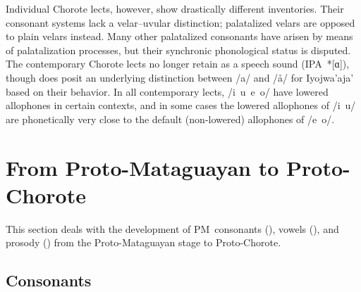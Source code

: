 \begin{table}
\caption{Proto-Chorote consonants}
\label{pch-inv-cons}
\end{table}

Individual Chorote lects, however, show drastically different  inventories. Their consonant systems lack a velar–uvular distinction; palatalized velars are opposed to plain velars instead. Many other palatalized consonants have arisen by means of palatalization processes, but their synchronic phonological status is disputed. The contemporary Chorote lects no longer retain  as a speech sound (IPA~*[ɑ]), though \citet{JC14b} does posit an underlying distinction between /a/ and /å/ for Iyojwa’aja’ based on their behavior. In all contemporary lects, /i~u~e~o/ have lowered allophones in certain contexts, and in some cases the lowered allophones of /i~u/ are phonetically very close to the default (non-lowered) allophones of /e~o/.

\section{From Proto-Mataguayan to Proto-Chorote} \label{pm-to-ch}

This section deals with the development of PM~consonants (), vowels (), and prosody () from the Proto-Mataguayan stage to Proto-Chorote.

\subsection{Consonants}\label{ch-cons}

